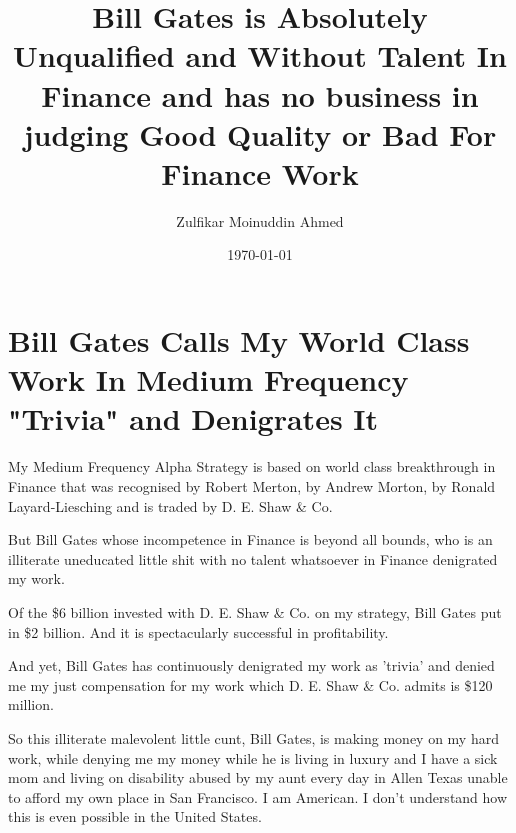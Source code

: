 \documentclass{amsart}
\title{Bill Gates is Absolutely Unqualified and Without Talent In Finance and has no business in judging Good Quality or Bad For Finance Work}
\author{Zulfikar Moinuddin Ahmed}
\date{\today}
\begin{document}
\maketitle

\section{Bill Gates Calls My World Class Work In Medium Frequency "Trivia" and Denigrates It}

My Medium Frequency Alpha Strategy is based on world class breakthrough in Finance that was recognised by Robert Merton, by Andrew Morton, by Ronald Layard-Liesching and is traded by D. E. Shaw \& Co. 

But Bill Gates whose incompetence in Finance is beyond all bounds, who is an illiterate uneducated little shit with no talent whatsoever in Finance denigrated my work.

Of the \$6 billion invested with D. E. Shaw \& Co. on my strategy, Bill Gates put in \$2 billion.  And it is spectacularly successful in profitability.

And yet, Bill Gates has continuously denigrated my work as 'trivia' and denied me my just compensation for my work which D. E. Shaw \& Co. admits is \$120 million.

So this illiterate malevolent little cunt, Bill Gates, is making money on my hard work, while denying me my money while he is living in luxury and I have a sick mom and living on disability abused by my aunt every day in Allen Texas unable to afford my own place in San Francisco.  I am American.  I don't understand how this is even possible in the United States.
\end{document}
